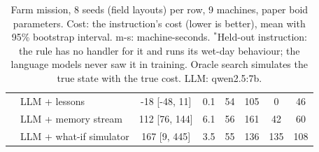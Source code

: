 \begin{table}[h!]
{\begin{tabular}{llcccccc}
 & LLM + lessons & -18 [-48, 11] & 0.1 & 54 & 105 & 0 & 46 \\
 & LLM + memory stream & 112 [76, 144] & 6.1 & 56 & 161 & 42 & 60 \\
 & LLM + what-if simulator & 167 [9, 445] & 3.5 & 55 & 136 & 135 & 108 \\
\hline
\end{tabular}}
\caption{Farm mission, 8 seeds (field layouts) per row, 9 machines, paper boid parameters. Cost: the instruction's cost (lower is better), mean with 95\% bootstrap interval. m-s: machine-seconds. $^*$Held-out instruction: the rule has no handler for it and runs its wet-day behaviour; the language models never saw it in training. Oracle search simulates the true state with the true cost. LLM: qwen2.5:7b.}
\label{tab:farm}
\end{table}
